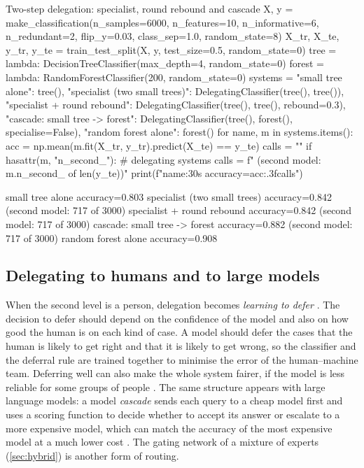 \begin{pylisting}[label={lst:delegation}]{Two-step delegation: specialist, round rebound and cascade}
X, y = make_classification(n_samples=6000, n_features=10, n_informative=6, n_redundant=2,
                           flip_y=0.03, class_sep=1.0, random_state=8)
X_tr, X_te, y_tr, y_te = train_test_split(X, y, test_size=0.5, random_state=0)
tree = lambda: DecisionTreeClassifier(max_depth=4, random_state=0)
forest = lambda: RandomForestClassifier(200, random_state=0)
systems = {"small tree alone": tree(),
           "specialist (two small trees)": DelegatingClassifier(tree(), tree()),
           "specialist + round rebound": DelegatingClassifier(tree(), tree(), rebound=0.3),
           "cascade: small tree -> forest":
               DelegatingClassifier(tree(), forest(), specialise=False),
           "random forest alone": forest()}
for name, m in systems.items():
    acc = np.mean(m.fit(X_tr, y_tr).predict(X_te) == y_te)
    calls = ""
    if hasattr(m, "n_second_"):                       # delegating systems
        calls = f"  (second model: {m.n_second_} of {len(y_te)})"
    print(f"{name:30s} accuracy={acc:.3f}{calls}")
\end{pylisting}
\begin{pyoutput}
small tree alone               accuracy=0.803
specialist (two small trees)   accuracy=0.842  (second model: 717 of 3000)
specialist + round rebound     accuracy=0.842  (second model: 717 of 3000)
cascade: small tree -> forest  accuracy=0.882  (second model: 717 of 3000)
random forest alone            accuracy=0.908
\end{pyoutput}

\subsection{Delegating to humans and to large models}

When the second level is a person, delegation becomes \emph{learning to defer}
\citep{madras2018predict,mozannar2020consistent}. The decision to defer should depend on the confidence of the model and also on how good the human is on each kind of case. A model
should defer the cases that the human is likely to get right and that it is likely to get wrong, so
the classifier and the deferral rule are trained together to minimise the error of the
human--machine team. Deferring well can also make the whole
system fairer, if the model is less reliable for some groups of people
\citep{madras2018predict}. The same structure appears with large language models: a model
\emph{cascade} sends each query to a cheap model first and uses a scoring function to decide
whether to accept its answer or escalate to a more expensive model, which can match the accuracy
of the most expensive model at a much lower cost \citep{chen2023frugalgpt}. The gating network of
a mixture of experts (\cref{sec:hybrid}) is another form of routing.


